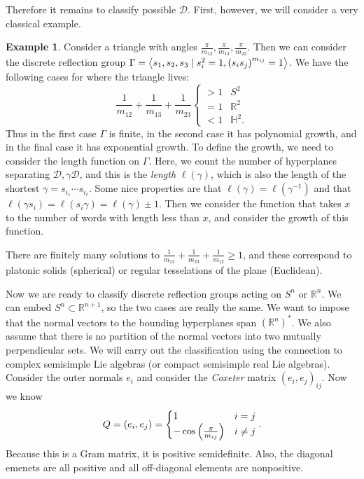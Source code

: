 \documentclass[leqno, openany]{memoir}
\theoremstyle{definition}
\newtheorem{exm}[thm]{Example}
\theoremstyle{remark}
\theoremstyle{plain}
\theoremstyle{definition}
\theoremstyle{remark}
\newcommand{\R}{\mathbb{R}}
\renewcommand{\H}{\mathbb{H}}
\newcommand{\mc}[1]{\mathcal{#1}}
\begin{document}
Therefore it remains to classify possible $\mc{D}$. First, however, we will
consider a very classical example.

\begin{exm} Consider a triangle with angles $\frac{\pi}{m_{12}},
    \frac{\pi}{m_{13}}, \frac{\pi}{m_{23}}$.  Then we can consider the discrete
    reflection group $\Gamma = \ev{s_1, s_2, s_3 \mid s_i^2 = 1, {(s_i
    s_j)}^{m_{ij}} = 1}$. We have the following cases for where the triangle
    lives: \[ \frac{1}{m_{12}} + \frac{1}{m_{13}} + \frac{1}{m_{23}}
        \begin{cases} > 1 & S^2 \\ = 1 & \R^2 \\ < 1 & \H^2.  \end{cases} \]
        Thus in the first case $\Gamma$ is finite, in the second case it has
        polynomial growth, and in the final case it has exponential growth. To
        define the growth, we need to consider the length function on $\Gamma$.
        Here, we count the number of hyperplanes separating $\mc{D}, \gamma
        \mc{D}$, and this is the \textit{length} $\ell(\gamma)$, which is also
        the length of the shortest $\gamma = s_{i_1} \cdots s_{i_{\ell}}$. Some
        nice properties are that $\ell(\gamma) = \ell(\gamma^{-1})$ and that
        $\ell(\gamma s_i) = \ell(s_i \gamma) = \ell(\gamma) \pm 1$. Then we
        consider the function that takes $x$ to the number of words with length
        less than $x$, and consider the growth of this function.

    There are finitely many solutions to $\frac{1}{m_{12}} + \frac{1}{m_{23}} +
\frac{1}{m_{12}} \geq 1$, and these correspond to platonic solids (spherical)
or regular tesselations of the plane (Euclidean).  \end{exm}

Now we are ready to classify discrete reflection groups acting on $S^n$ or
$\R^n$. We can embed $S^n \subset \R^{n+1}$, so the two cases are really the
same. We want to impose that the normal vectors to the bounding hyperplanes
span ${(\R^n)}^*$. We also assume that there is no partition of the normal
vectors into two mutually perpendicular sets. We will carry out the
classification using the connection to complex semisimple Lie algebras (or
compact semisimple real Lie algebras). Consider the outer normals $e_i$ and
consider the \textit{Coxeter} matrix ${(e_i, e_j)}_{ij}$. Now we know \[ Q =
    (e_i, e_j) = \begin{cases} 1 & i = j \\ - \cos \qty(\frac{\pi}{m_{ij}}) & i
    \neq j \end{cases}. \] Because this is a Gram matrix, it is positive
    semidefinite. Also, the diagonal emenets are all positive and all
    off-diagonal elements are nonpositive. 
\end{document}
